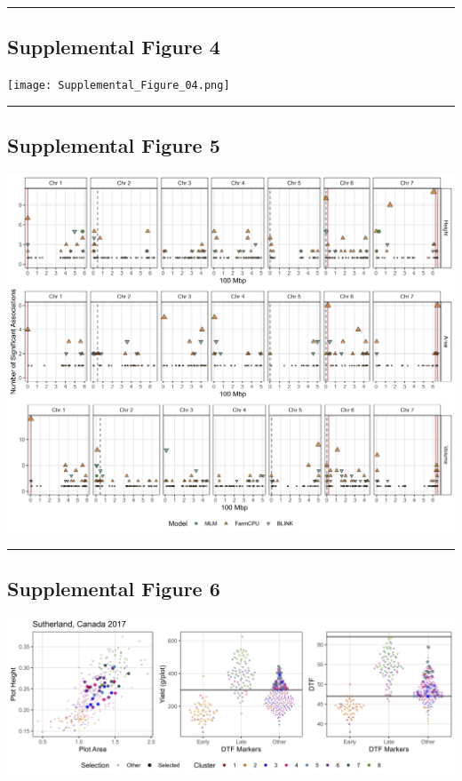 \documentclass[
]{article}
\begin{document}
\begin{center}\rule{0.5\linewidth}{0.5pt}\end{center}

\subsection{Supplemental Figure 4}\label{supplemental-figure-4}

\texttt{[image: Supplemental\_Figure\_04.png]}

\begin{center}\rule{0.5\linewidth}{0.5pt}\end{center}

\subsection{Supplemental Figure 5}\label{supplemental-figure-5}

\includegraphics{Supplemental_Figure_05.png}

\begin{center}\rule{0.5\linewidth}{0.5pt}\end{center}

\subsection{Supplemental Figure 6}\label{supplemental-figure-6}

\includegraphics{Supplemental_Figure_06.png}
\end{document}
